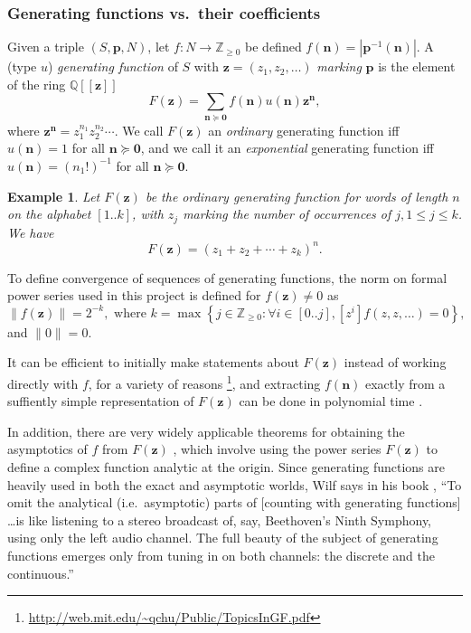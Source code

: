 \documentclass[12pt]{article}
\theoremstyle{plain}
\newtheorem{exa}{Example}
\newcommand{\norm}[1]{\lVert#1\rVert}
\begin{document}
\subsubsection{Generating functions vs.\ their coefficients}
Given a triple \( (S, \boldsymbol{p}, N) \), let \(f:N \rightarrow \mathbb{Z}_{\geq 0} \) be defined
\( f( \boldsymbol{n} ) = | \boldsymbol{p}^{-1} ( \boldsymbol{n} )| \).
A (type \(u\)) \emph{generating function} of \( S \) with \( \boldsymbol{z} = (z_1, z_2, \dots) \)
\emph{marking} \( \boldsymbol{p} \) is the element of the ring \( \mathbb{Q}[[\boldsymbol{z}]] \)
\[ F( \boldsymbol{z} ) = \sum_{\boldsymbol{n} \succeq \boldsymbol{0}} f(\boldsymbol{n}) u(\boldsymbol{n}) \boldsymbol{z}^{\boldsymbol{n}}, \]
where \( \boldsymbol{z}^{\boldsymbol{n}} = z_1^{n_1} z_2^{n_2} \cdots \).
We call \( F( \boldsymbol{z} ) \) an
\emph{ordinary} generating function iff
 \( u(\boldsymbol{n}) = 1 \) for all \( \boldsymbol{n} \succeq \boldsymbol{0} \),
and we call it an
\emph{exponential} generating function iff
 \( u(\boldsymbol{n}) = (n_1!)^{-1} \) for all \( \boldsymbol{n} \succeq \boldsymbol{0} \).

\begin{exa}
Let \( F( \boldsymbol{z}) \) be the ordinary generating function for words of length \( n \) on the alphabet \([1..k]\), with \( z_j \) marking the number of occurrences of \( j, 1 \leq j \leq k \).
We have \[ F(\boldsymbol{z}) = (z_1 + z_2 + \cdots + z_k)^n. \]
\end{exa}

To define convergence of sequences of generating functions, the norm on formal power series used in this project is defined for \( f( \boldsymbol{z} ) \neq 0 \) as
\[ \norm{f(\boldsymbol{z})} = 2^{-k}, \text{ where } k= \max \left\{ j \in \mathbb{Z}_{\geq 0} : \forall i \in [0..j], [z^i]f(z,z, \dots) = 0 \right\}, \]
and \( \norm{0} = 0 \).

It can be efficient to initially make statements about \( F( \boldsymbol{z} ) \) instead of working directly with \( f \), for a variety of reasons \cite{ac,generatingfunctionology}\footnote{
 \url{http://web.mit.edu/~qchu/Public/TopicsInGF.pdf}
}, and  extracting \( f(\boldsymbol{n}) \) exactly from a suffiently simple representation of \( F( \boldsymbol{z} ) \) can be done in polynomial time \cite{companion}.

In addition, there are very widely applicable theorems for obtaining the asymptotics of \(f\) from \( F(\boldsymbol{z}) \) \cite{ac}, which involve using the power series \( F(\boldsymbol{z}) \) to define a complex function analytic at the origin.
Since generating functions are heavily used in both the exact and asymptotic worlds, Wilf says in his book \cite{generatingfunctionology}, ``To omit the analytical (i.e.\ asymptotic) parts of [counting with generating functions] \dots is like listening to a stereo broadcast of, say, Beethoven's Ninth Symphony, using only the left audio channel.
The full beauty of the subject of generating functions emerges only from tuning in on both channels: the discrete and the continuous.''
\end{document}
